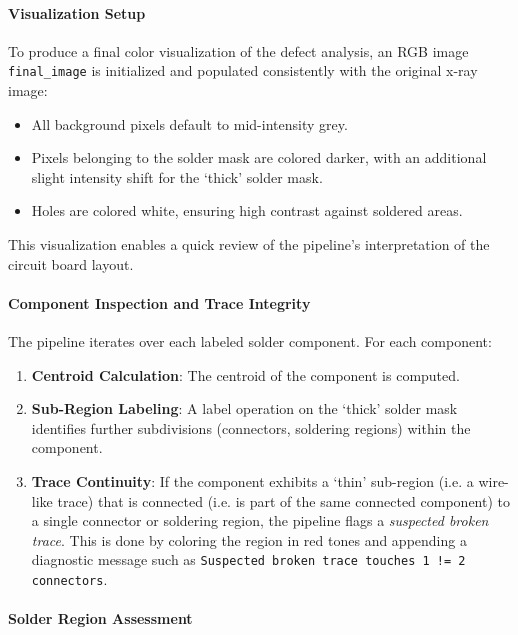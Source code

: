 \documentclass[a4paper,12pt]{article}
\begin{document}
\paragraph{Visualization Setup}

To produce a final color visualization of the defect analysis, an RGB image \texttt{final\_image} is initialized and populated consistently with the original x-ray image:
\begin{itemize}
    \item All background pixels default to mid-intensity grey.
    \item Pixels belonging to the solder mask are colored darker, with an additional slight intensity shift for the `thick' solder mask.
    \item Holes are colored white, ensuring high contrast against soldered areas.
\end{itemize}
This visualization enables a quick review of the pipeline's interpretation of the circuit board layout.

\paragraph{Component Inspection and Trace Integrity}

The pipeline iterates over each labeled solder component. For each component:
\begin{enumerate}
    \item \textbf{Centroid Calculation}: The centroid of the component is computed.
    \item \textbf{Sub-Region Labeling}: A label operation on the `thick' solder mask identifies further subdivisions (connectors, soldering regions) within the component.
    \item \textbf{Trace Continuity}: If the component exhibits a `thin' sub-region (i.e. a wire-like trace) that is connected (i.e. is part of the same connected component) to a single connector or soldering region, the pipeline flags a \textit{suspected broken trace}. This is done by coloring the region in red tones and appending a diagnostic message such as \texttt{Suspected broken trace touches 1 != 2 connectors}.
\end{enumerate}

\paragraph{Solder Region Assessment}
\end{document}
